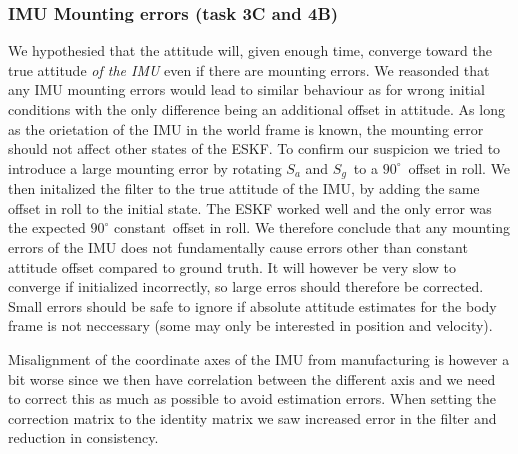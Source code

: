 \subsubsection{IMU Mounting errors (task 3C and 4B)}
We hypothesied that the attitude will, given enough time, converge toward the true attitude \textit{of the IMU} even if there are mounting errors. We reasonded that any IMU mounting errors would lead to similar behaviour as for wrong initial conditions with the only difference being an additional offset in attitude. As long as the orietation of the IMU in the world frame is known, the mounting error should not affect other states of the ESKF. 
To confirm our suspicion we tried to introduce a large mounting error by rotating $S_a$ and $S_g$ to a $90^\circ$ offset in roll. We then initalized the filter to the true attitude of the IMU, by adding the same offset in roll to the initial state.
The ESKF worked well and the only error was the expected $90^\circ$ constant offset in roll. We therefore conclude that any mounting errors of the IMU does not fundamentally cause errors other than constant attitude offset compared to ground truth. It will however be very slow to converge if initialized incorrectly, so large erros should therefore be corrected. Small errors should be safe to ignore if absolute attitude estimates for the body frame is not neccessary (some may only be interested in position and velocity).   

Misalignment of the coordinate axes of the IMU from manufacturing is however a bit worse since we then have correlation between the different axis and we need to correct this as much as possible to avoid estimation errors. When setting the correction matrix to the identity matrix we saw increased error in the filter and reduction in consistency.  




